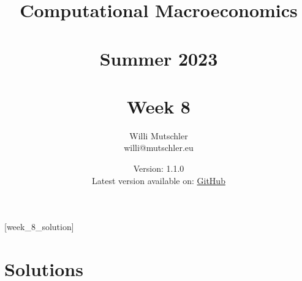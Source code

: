 
\newif\ifDisplaySolutions\DisplaySolutionstrue


\title{Computational Macroeconomics\\~\\Summer 2023\\~\\Week 8}
\author{Willi Mutschler\\willi@mutschler.eu}
\date{Version: 1.1.0\\Latest version available on: \href{https://github.com/wmutschl/Computational-Macroeconomics/releases/latest/download/week_8.pdf}{GitHub}}
\maketitle\thispagestyle{empty}

\newpage
{}[week_8_solution]
\tableofcontents\thispagestyle{empty}\newpage

\setcounter{page}{1}
\newpage
\newpage
\newpage
\newpage

\printbibliography
\newpage

\ifDisplaySolutions 
\newpage
\appendix
\section{Solutions}

\fi
